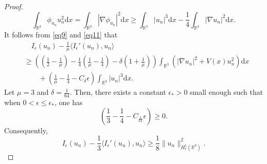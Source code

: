 \documentclass[12pt]{amsart}
\numberwithin{equation}{section}
\theoremstyle{definition}
\begin{document}
\begin{proof}
\begin{equation}
\int_{\mathbb R^3}\phi_{u_n}u_n^2\text{d}x=\int_{\mathbb R^3}|\nabla\phi_{u_n}|^2\text{d}x\geq \int_{\mathbb R^3}|u_n|^3\text{d}x-\frac{1}{4}\int_{\mathbb R^3}|\nabla u_n|^2\text{d}x.
\end{equation}
It follows from \eqref{eq9} and \eqref{eq11} that
\begin{equation*}
	\begin{split}
	&\quad I_{\epsilon}(u_n)-\frac{1}{\mu}\langle I_{\epsilon}'(u_n),u_n\rangle\\
	&\geq \left(\left(\frac{1}{2}-\frac{1}{\mu}\right)-\frac{1}{4}\left(\frac{1}{\mu}-\frac{1}{4}\right)-\delta\left(1+\frac{1}{\mu}\right)\right)\int_{\mathbb R^3}\left(|\nabla u_n|^2+V(x)u_n^2\right)\text{d}x\\
	&\quad\quad+\left(\frac{1}{\mu}-\frac{1}{4}-C_\delta\epsilon\right)\int_{\mathbb R^3}|u_n|^3\text{d}x.
\end{split}\end{equation*}
Let $\mu=3$ and $\delta=\frac{1}{64}$. Then, there exists a constant $\epsilon_*>0$ small enough such that when   $0<\epsilon\leq\epsilon_*$, one has
$$\left(\frac{1}{3}-\frac{1}{4}-C_{\frac{1}{64}}\epsilon\right)\geq0.$$
Consequently,
\begin{equation*}
	I_{\epsilon}(u_n)-\frac{1}{3}\langle I_{\epsilon}'(u_n),u_n\rangle\geq \frac{1}{8}\|u_n\|^{2}_{H^1_r(\mathbb R^3)}.
	\end{equation*}
	

\end{proof}
\end{document}
